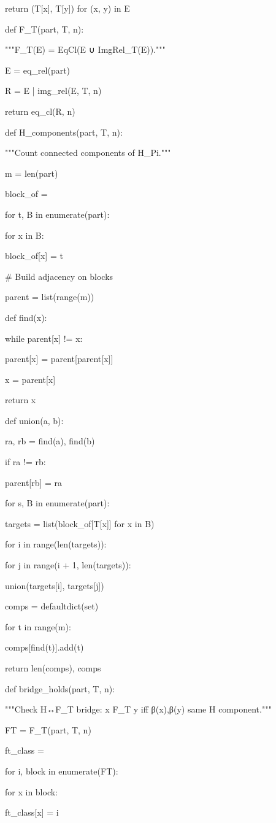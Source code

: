 return {(T[x], T[y]) for (x, y) in E}


def F_T(part, T, n):

"""F_T(E) = EqCl(E ∪ ImgRel_T(E))."""

E = eq_rel(part)

R = E | img_rel(E, T, n)

return eq_cl(R, n)


def H_components(part, T, n):

"""Count connected components of H_Pi."""

m = len(part)

block_of = {}

for t, B in enumerate(part):

for x in B:

block_of[x] = t

# Build adjacency on blocks

parent = list(range(m))

def find(x):

while parent[x] != x:

parent[x] = parent[parent[x]]

x = parent[x]

return x

def union(a, b):

ra, rb = find(a), find(b)

if ra != rb:

parent[rb] = ra

for s, B in enumerate(part):

targets = list({block_of[T[x]] for x in B})

for i in range(len(targets)):

for j in range(i + 1, len(targets)):

union(targets[i], targets[j])

comps = defaultdict(set)

for t in range(m):

comps[find(t)].add(t)

return len(comps), comps


def bridge_holds(part, T, n):

"""Check H↔F_T bridge: x F_T y iff β(x),β(y) same H component."""

FT = F_T(part, T, n)

ft_class = {}

for i, block in enumerate(FT):

for x in block:

ft_class[x] = i

